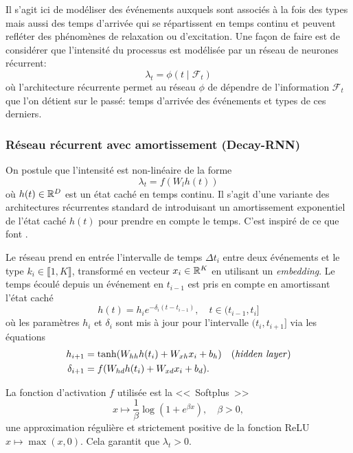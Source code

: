 \documentclass[../main.tex]{subfiles}
\begin{document}
Il s'agit ici de modéliser des événements auxquels sont associés à la fois des types mais aussi des temps d'arrivée qui se répartissent en temps continu et peuvent refléter des phénomènes de relaxation ou d'excitation. Une façon de faire est de considérer que l'intensité du processus est modélisée par un réseau de neurones récurrent:
\[
	\lambda_t = \phi(t\mid \mathcal{F}_t)
\]
où l'architecture récurrente permet au réseau $\phi$ de dépendre de l'information $\mathcal{F}_t$ que l'on détient sur le passé: temps d'arrivée des événements et types de ces derniers.



\subsubsection{Réseau récurrent avec amortissement (Decay-RNN)}\label{sssec:decayRNN}

On postule que l'intensité est non-linéaire de la forme
\begin{equation}\label{eq:decayRNNintensity}
\lambda_t = f(W_l h(t))
\end{equation}
où $h(t)\in\mathbb{R}^D$ est un état caché en temps continu. Il s'agit d'une variante des architectures récurrentes standard de \citeauthor{elman1990srnn} introduisant un amortissement exponentiel de l'état caché $h(t)$ pour prendre en compte le temps. C'est inspiré de ce que font \citeauthor{meiEisnerNeuralHawkes} \cite{meiEisnerNeuralHawkes}.

Le réseau prend en entrée l'intervalle de temps $\Delta t_i$ entre deux événements et le type $k_i\in\llbracket 1,K\rrbracket$, transformé en vecteur $x_i\in\mathbb{R}^K$ en utilisant un \textit{embedding}.
Le temps écoulé depuis un événement en $t_{i-1}$ est pris en compte en amortissant l'état caché
\begin{equation}
h(t) = h_{i}e^{-\delta_i(t-t_{i-1})},\quad t\in(t_{i-1},t_i]
\end{equation}
où les paramètres $h_i$ et $\delta_i$ sont mis à jour pour l'intervalle $(t_i,t_{i+1}]$ via les équations
\begin{subequations}
\begin{align}
	h_{i+1} &= \tanh(W_{hh}h(t_i) + W_{xh}x_i + b_{h})\quad\text{(\textit{hidden layer})} \\
	\delta_{i+1} &= f(W_{hd}h(t_i) + W_{xd}x_i + b_d).
\end{align}
\end{subequations}

La fonction d'activation $f$ utilisée est la <<~Softplus~>>
\[
	x\mapsto \frac{1}{\beta}\log(1+e^{\beta x}),\quad\beta > 0,
\]
une approximation régulière et strictement positive de la fonction ReLU $x\mapsto \max(x,0)$. Cela garantit que $\lambda_t > 0$.
\end{document}
